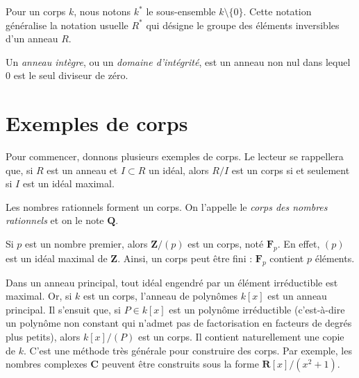\noindent
Pour un corps $k$, nous notons $k^*$ le sous-ensemble $k \setminus \{0\}$.
Cette notation généralise la notation usuelle $R^*$ qui désigne le groupe des
éléments inversibles d'un anneau $R$.

\begin{definition}
\label{definition-domain}
Un {\it anneau intègre}, ou un {\it domaine d'intégrité}, est un anneau non nul dans lequel $0$
est le seul diviseur de zéro.
\end{definition}



\section{Exemples de corps}
\label{section-examples}

\noindent
Pour commencer, donnons plusieurs exemples de corps. Le lecteur se rappellera
que, si $R$ est un anneau et $I \subset R$ un idéal, alors $R/I$ est un corps
si et seulement si $I$ est un idéal maximal.

\begin{example}
\label{example-rational-numbers}
Les nombres rationnels forment un corps. On l'appelle le
{\it corps des nombres rationnels} et on le note $\mathbf{Q}$.
\end{example}

\begin{example}
\label{example-prime-field}
Si $p$ est un nombre premier, alors $\mathbf{Z}/(p)$ est un corps, noté
$\mathbf{F}_p$. En effet, $(p)$ est un
idéal maximal de $\mathbf{Z}$. Ainsi, un corps peut être fini : $\mathbf{F}_p$
contient $p$ éléments.
\end{example}

\begin{example}
\label{example-quotient-polymial-ring}
Dans un anneau principal, tout idéal engendré par un élément irréductible
est maximal. Or, si $k$ est un corps, l'anneau de polynômes $k[x]$ est un
anneau principal. Il s'ensuit que, si $P \in k[x]$ est un polynôme irréductible
(c'est-à-dire un polynôme non constant
qui n'admet pas de factorisation en facteurs de degrés plus petits), alors
$k[x]/(P)$ est un corps. Il contient naturellement une copie de $k$.
C'est une méthode très générale pour construire des corps. Par exemple, les
nombres complexes $\mathbf{C}$
peuvent être construits sous la forme $\mathbf{R}[x]/(x^2 + 1)$.
\end{example}

